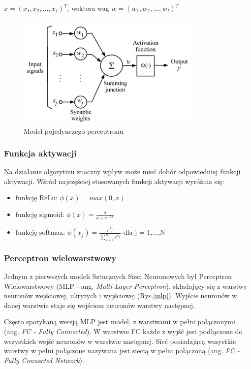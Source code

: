 $x = (x_1, x_2,...,x_I)^T$, wektora wag $w = (w_1, w_2,...,w_I)^T$ 

\begin{figure}[h]
  \centering
  \includegraphics[width=0.8\textwidth]{img/neuron.png}
  \caption{Model pojedynczego perceptronu}
  \label{neuron}
\end{figure}


\subsubsection{Funkcja aktywacji}
Na działanie algorytmu znaczny wpływ może mieć dobór odpowiedniej 
funkcji aktywacji. Wśród najczęściej stosowanych funkcji aktywacji
wyróżnia się:
\begin{itemize}
    \item funkcję ReLu: $\phi(x) = max(0, x)$
    \item funkcję sigmoid: $\phi(x) = \frac{a}{a + e^{-bx}}$
    \item funkcję softmax: $\phi(x_j) = \frac{e^{x_j}}{\sum_{k=1}^{K}{e^{x_k}}}$ dla j = 1,...,N
\end{itemize}

\subsubsection{Perceptron wielowarstwowy}
Jednym z pierwszych modeli Sztucznych Sieci Neuronowych był Perceptron
Wielowarstwowy (MLP - ang. \emph{Multi-Layer Perceptron}), składający 
się z warstwy neuronów wejściowej, ukrytych i wyjściowej (Rys.\ref{mlp}).
Wyjście neuronów w danej warstwie staje się wejściem neuronów warstwy następnej.

Często spotykaną wersją MLP jest model, z warstwami w pełni połączonymi
(ang. \emph{FC - Fully Connected}). W warstwie FC każde z wyjść jest podłączone do 
wszystkich wejść neuronów w warstwie następnej. Sieć posiadającą wszystkie warstwy
w pełni połączone nazywana jest siecią w pełni połączoną (ang. \emph{FC - Fully 
Connected Network}).

